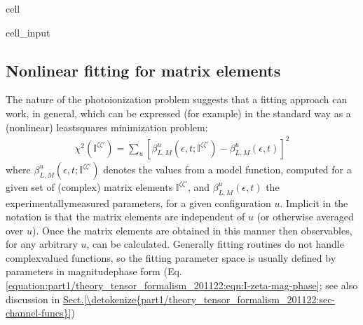 \documentclass[letterpaper,table,10pt,english]{jupyterBook}
\begin{document}
\begin{sphinxuseclass}{cell}\begin{sphinxVerbatimInput}

\begin{sphinxuseclass}{cell_input}
\begin{sphinxVerbatim}[commandchars=\\\{\}]
\end{sphinxVerbatim}

\end{sphinxuseclass}\end{sphinxVerbatimInput}

\end{sphinxuseclass}

\subsection{Non\sphinxhyphen{}linear fitting for matrix elements}
\label{\detokenize{part1/numerics_231122:non-linear-fitting-for-matrix-elements}}
\sphinxAtStartPar
The nature of the photoionization problem suggests that a fitting approach can work, in general, which can be expressed (for example) in the standard way as a (non\sphinxhyphen{}linear) least\sphinxhyphen{}squares minimization problem:
\begin{equation}\label{equation:part1/numerics_231122:eq:chi2-I}
\begin{split}
\chi^{2}(\mathbb{I}^{\zeta\zeta'})=\sum_{u}\left[\beta^{u}_{L,M}(\epsilon,t;\mathbb{I}^{\zeta\zeta'})-\beta^{u}_{L,M}(\epsilon,t)\right]^{2}
\end{split}
\end{equation}
\sphinxAtStartPar
where \(\beta^{u}_{L,M}(\epsilon,t;\mathbb{I}^{\zeta\zeta'})\) denotes  the values from a model function, computed for a given set of (complex) matrix elements \(\mathbb{I}^{\zeta\zeta'}\), and \(\beta^{u}_{L,M}(\epsilon,t)\) the experimentally\sphinxhyphen{}measured parameters, for a given configuration \(u\). Implicit in the notation is that the matrix elements are independent of \(u\) (or otherwise averaged over \(u\)). Once the matrix elements are obtained in this manner then {\hyperref[\detokenize{backmatter/glossary:term-MF}]{}} observables, for any arbitrary \(u\), can be calculated. Generally fitting routines do not handle complex\sphinxhyphen{}valued functions, so the fitting parameter space is usually defined by parameters in magnitude\sphinxhyphen{}phase form (Eq. \eqref{equation:part1/theory_tensor_formalism_201122:eqn:I-zeta-mag-phase}; see also discussion in \hyperref[\detokenize{part1/theory_tensor_formalism_201122:sec-channel-funcs}]{Sect.\@ \ref{\detokenize{part1/theory_tensor_formalism_201122:sec-channel-funcs}}})
\end{document}
